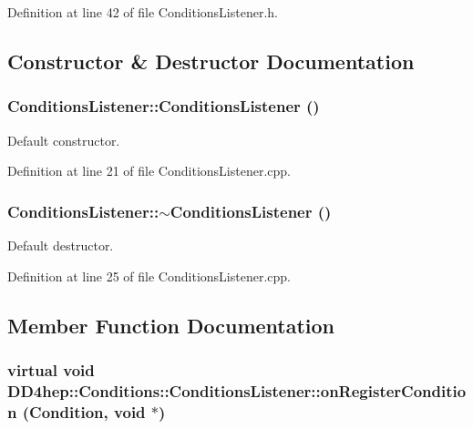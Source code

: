 Definition at line 42 of file ConditionsListener.h.

\subsection{Constructor \& Destructor Documentation}
\hypertarget{class_d_d4hep_1_1_conditions_1_1_conditions_listener_a3045043973d530d2c01ccb26462a8795}{
\subsubsection[{ConditionsListener}]{\setlength{\rightskip}{0pt plus 5cm}ConditionsListener::ConditionsListener ()}}
\label{class_d_d4hep_1_1_conditions_1_1_conditions_listener_a3045043973d530d2c01ccb26462a8795}


Default constructor. 

Definition at line 21 of file ConditionsListener.cpp.\hypertarget{class_d_d4hep_1_1_conditions_1_1_conditions_listener_a75358af2c660cee415619ba50c2bea74}{
\subsubsection[{$\sim$ConditionsListener}]{\setlength{\rightskip}{0pt plus 5cm}ConditionsListener::$\sim$ConditionsListener ()}}
\label{class_d_d4hep_1_1_conditions_1_1_conditions_listener_a75358af2c660cee415619ba50c2bea74}


Default destructor. 

Definition at line 25 of file ConditionsListener.cpp.

\subsection{Member Function Documentation}
\hypertarget{class_d_d4hep_1_1_conditions_1_1_conditions_listener_a848d047b6a957987ea1a8256e6efd75a}{
\subsubsection[{onRegisterCondition}]{\setlength{\rightskip}{0pt plus 5cm}virtual void DD4hep::Conditions::ConditionsListener::onRegisterCondition ({\bf Condition}, \/  void $\ast$)}}
\label{class_d_d4hep_1_1_conditions_1_1_conditions_listener_a848d047b6a957987ea1a8256e6efd75a}


